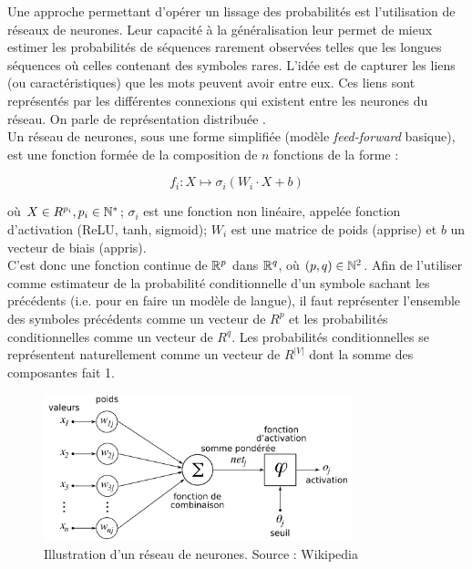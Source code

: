 Une approche permettant d'opérer un lissage des probabilités est l'utilisation de réseaux de neurones. 
Leur capacité à la généralisation leur permet de mieux estimer les probabilités de séquences rarement observées telles que les longues séquences où celles contenant des symboles rares.
L'idée est de capturer les liens (ou caractéristiques) que les mots peuvent avoir entre eux. Ces liens sont représentés par les différentes connexions qui existent entre les neurones du réseau.
On parle de \og représentation distribuée \fg{}. \\

Un réseau de neurones, sous une forme simplifiée (modèle \textit{feed-forward} basique), est une fonction formée de la composition de $n$ fonctions de la forme :

\[ f_i : X \mapsto \sigma_i(W_i\cdot X + b) \]

où $X \in R^{p_i}, p_i \in \mathbb{N}^*$; $\sigma_i$ est une fonction non linéaire, appelée fonction d'activation (ReLU, tanh, sigmoid); $W_i$ est une matrice de poids (apprise) et $b$ un vecteur de biais (appris). \\

C'est donc une fonction continue de $\mathbb{R}^p$ dans $\mathbb{R}^q$, où $(p,q) \in \mathbb{N}^2$. Afin de l'utiliser comme estimateur de la probabilité conditionnelle d'un symbole sachant les précédents (i.e. pour en faire un modèle de langue), il faut représenter l'ensemble des symboles précédents comme un vecteur de $R^p$ et les probabilités conditionnelles comme un vecteur de $R^q$.
Les probabilités conditionnelles se représentent naturellement comme un vecteur de $R^{\vert V \vert}$ dont la somme des composantes fait 1.

\begin{figure}[h]
\begin{center}
  \includegraphics[width=0.8\textwidth]{img/NN.png}
  \caption{Illustration d'un réseau de neurones. Source : Wikipedia}
\end{center}
\end{figure}


